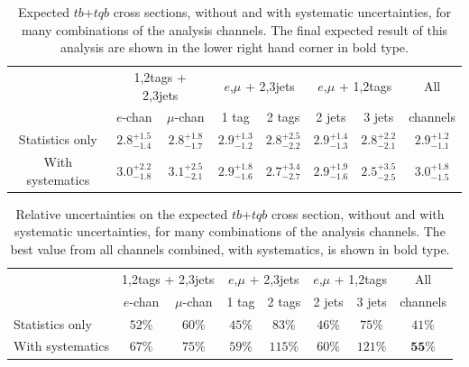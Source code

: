 \begin{table}[!h!tbp]
\begin{center}
\caption{Expected $tb$+$tqb$ cross sections, without and
with systematic uncertainties, for many combinations of the analysis
channels. The final expected result of this analysis are shown in the
lower right hand corner in bold type.}
\label{tab:expxsecs}
\begin{tabular}{c|cc|cc|cc|c}
& \multicolumn{2}{c|}{1,2tags + 2,3jets}& \multicolumn{2}{c|}{$e$,$\mu$ + 2,3jets}
& \multicolumn{2}{c|}{$e$,$\mu$ + 1,2tags}& All \\
                 &  $e$-chan & $\mu$-chan& 1 tag & 2 tags& 2 jets& 3 jets&channels\\
\hline
Statistics only  &  $2.8^{+1.5}_{-1.4}$  & $2.8^{+1.8}_{-1.7}$ & $2.9^{+1.3}_{-1.2}$ & $2.8^{+2.5}_{-2.2}$ & $2.9^{+1.4}_{-1.3}$ & $2.8^{+2.2}_{-2.1}$ & $2.9^{+1.2}_{-1.1}$ \\
With systematics &  $3.0^{+2.2}_{-1.8}$  & $3.1^{+2.5}_{-2.1}$ & $2.9^{+1.8}_{-1.6}$ & $2.7^{+3.4}_{-2.7}$ & $2.9^{+1.9}_{-1.6}$ & $2.5^{+3.5}_{-2.5}$ & $\mathbf{3.0^{+1.8}_{-1.5}}$ \\
\end{tabular}
\vspace{-0.1in}
\end{center}
\end{table}

\vspace{-0.1in}
\begin{table}[!h!tbp]
\begin{center}
\caption{Relative uncertainties on the expected
$tb$+$tqb$ cross section, without and with systematic uncertainties,
for many combinations of the analysis channels. The best value from
all channels combined, with systematics, is shown in bold type.}
\label{exp-errors}
\begin{tabular}{l|cc|cc|cc|c}
& \multicolumn{2}{c|}{1,2tags + 2,3jets}& \multicolumn{2}{c|}{$e$,$\mu$ + 2,3jets}
& \multicolumn{2}{c|}{$e$,$\mu$ + 1,2tags}& All \\
                 &  $e$-chan & $\mu$-chan& 1 tag & 2 tags& 2 jets& 3 jets&channels\\
\hline
Statistics only  &  $52\%$  & $60\%$ & $45\%$ & $83\%$  &  $46\%$  & $75\%$  & $41\%$     \\
With systematics &  $67\%$  & $75\%$ & $59\%$ & $115\%$ &  $60\%$  & $121\%$ & $\mathbf{55\%}$     \\
\end{tabular}
\vspace{-0.1in}
\end{center}
\end{table}